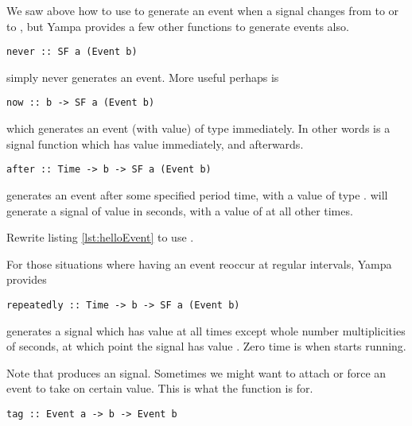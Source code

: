 We saw above how to use  to generate an event when a signal changes from  to  or  to , but Yampa provides a few other functions to generate events also.

\begin{lstlisting}
never :: SF a (Event b)
\end{lstlisting}

\noindent simply never generates an event. More useful perhaps is

\begin{lstlisting}
now :: b -> SF a (Event b)
\end{lstlisting}

\noindent which generates an event (with value) of type  immediately. In other words  is a signal function which has value  immediately, and  afterwards.

\begin{lstlisting}
after :: Time -> b -> SF a (Event b)
\end{lstlisting}

\noindent generates an event after some specified period time, with a value of type .  will generate a signal of value  in  seconds, with a value of  at all other times.

\begin{exercise}
Rewrite listing \ref{lst:helloEvent} to use .
\end{exercise}

\noindent For those situations where having an event reoccur at regular intervals, Yampa provides

\begin{lstlisting}
repeatedly :: Time -> b -> SF a (Event b)
\end{lstlisting}

\noindent {} generates a signal which has value  at all times except whole number multiplicities of  seconds, at which point the signal has value . Zero time is when  starts running.

Note that  produces an  signal. Sometimes we might want to attach or force an event to take on certain value. This is what the function  is for.

\begin{lstlisting}
tag :: Event a -> b -> Event b
\end{lstlisting}

